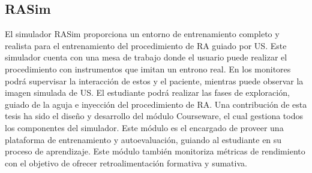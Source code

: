 
\subsection{RASim}
\label{conclu:rasim}



El simulador \ac{RASim} proporciona un entorno de entrenamiento completo y realista para el entrenamiento del procedimiento de \ac{RA} guiado por \ac{US}. Este simulador cuenta con una mesa de trabajo donde el usuario puede realizar el procedimiento con instrumentos que imitan un entrono real.
En los monitores podrá supervisar la interacción de estos y el paciente, mientras puede observar la imagen simulada de \ac{US}. El estudiante podrá realizar las fases de exploración, guiado de la aguja e inyección del procedimiento de \ac{RA}. Una contribución de esta tesis ha sido el diseño y desarrollo del módulo  \ac{Courseware}, el cual gestiona todos los componentes del simulador. Este módulo es el encargado de proveer una plataforma de entrenamiento y autoevaluación, guiando al estudiante en su proceso de aprendizaje. Este módulo también monitoriza métricas de rendimiento con el objetivo de ofrecer retroalimentación formativa y sumativa. 


